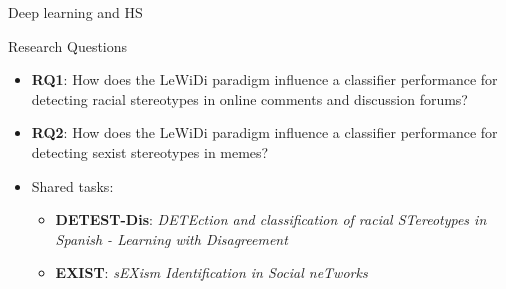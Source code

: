 \begin{frame}{Deep learning and HS}

\end{frame}

\begin{frame}{Research Questions}
    \begin{itemize}
        \item \textbf{RQ1}: How does the LeWiDi paradigm influence a classifier performance for detecting racial stereotypes in online comments and discussion forums?
        \item \textbf{RQ2}: How does the LeWiDi paradigm influence a classifier performance for detecting sexist stereotypes in memes?
        \item Shared tasks:
        \begin{itemize}
            \item \textbf{DETEST-Dis}: \textit{DETEction and classification of racial STereotypes in Spanish - Learning with Disagreement}
            \item \textbf{EXIST}: \textit{sEXism Identification in Social neTworks}
        \end{itemize} 
    \end{itemize}
\end{frame}